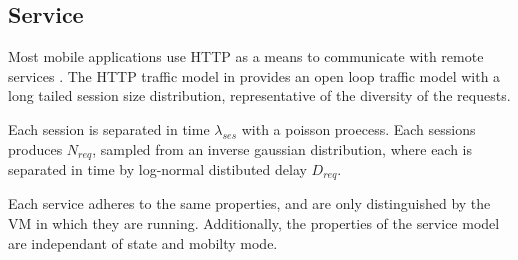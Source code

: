 \subsection{Service}
Most mobile applications use HTTP as a means to communicate with remote services \cite{maier2010first,falaki2010first}. The HTTP traffic model in \cite{liu2001traffic} provides an open loop traffic model with a long tailed session size distribution, representative of the diversity of the requests. 

Each session is separated in time $\lambda_{ses}$ with a poisson proecess. Each sessions produces $N_{req}$, sampled from an inverse gaussian distribution, where each is separated in time by log-normal distibuted delay $D_{req}$.

Each service adheres to the same properties, and are only distinguished by the VM in which they are running. Additionally, the properties of the service model are independant of \ue state and mobilty mode.


